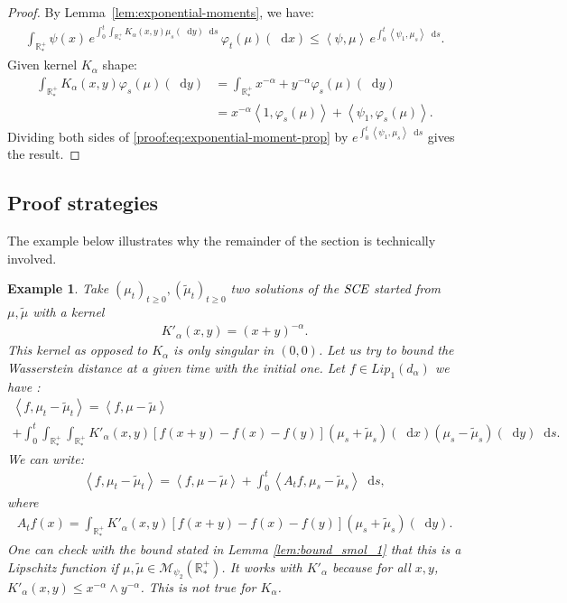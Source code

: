 \documentclass[11pt,a4paper]{article}
\newcommand{\RRP}{\mathbb{R}^+_*}
\newcommand{\MC}{\mathcal{M}}
\newcommand{\SCE}{\emph{SCE}}
\newcommand{\Proc}[1]{\left(#1\right)_{t\geq 0}}
\newcommand{\brac}[1]{\left\langle#1\right\rangle}
\newcommand{\dd}{\mathop{}\!\mathrm{d}}
\newtheorem{example}[theorem]{Example}
\begin{document}
\begin{proof}
    By Lemma~\ref{lem:exponential-moments}, we have:
    \begin{align}\label{proof:eq:exponential-moment-prop}
        \int_{\RRP} \psi(x)\, e^{\int_0^t \int_{\RRP} K_{\alpha}(x,y) \mu_s(\dd y)\dd s}\, \varphi_t(\mu)(\dd x) \leq \brac{\psi,\mu} \, e^{\int_0^t \brac{\psi_1,\mu_s} \dd s}.
    \end{align}
    Given kernel $K_\alpha$ shape:
    \begin{align*}
        \int_{\RRP} K_{\alpha}(x,y) \varphi_s(\mu)(\dd y) 
        &= \int_{\RRP}x^{-\alpha} + y^{-\alpha} \varphi_s(\mu)(\dd y) \\
        &= x^{-\alpha} \brac{1,\varphi_s(\mu)} + \brac{\psi_1,\varphi_s(\mu)}.
    \end{align*}
    Dividing both sides of \eqref{proof:eq:exponential-moment-prop} by $e^{\int_0^t \brac{\psi_1,\mu_s} \dd s}$ gives the result.
\end{proof}

\subsection{Proof strategies}\label{section:wass-outline}
The example below illustrates why the remainder of the section is technically involved.
\begin{example}\label{exp:wasserstein-is-tricky}
    Take $\Proc{\mu_t} , \Proc{\tilde{\mu}_t}$ two solutions of the $\SCE$ started from $\mu,\tilde{\mu}$ with a kernel
    \begin{align*}
        K'_\alpha(x,y) = (x+y)^{-\alpha} .
    \end{align*}
    This kernel as opposed to $K_\alpha$ is only singular in $(0,0)$. Let us try to bound the Wasserstein distance at a given time with the initial one. Let $f \in Lip_1(d_\alpha)$ we have :
    \begin{multline*}
        \brac{f,\mu_t - \tilde{\mu}_t} = \brac{f,\mu - \tilde{\mu}} \\
        + \int_0^t \int_{\RRP}\int_{\RRP} K'_\alpha(x,y) \left[f(x+y) - f(x) -f(y) \right]\left(\mu_s + \tilde{\mu}_s\right)(\dd x) \left( \mu_s - \tilde{\mu}_s\right)(\dd y)\dd s.
    \end{multline*}
    We can write:
    \begin{align*}
        \brac{f,\mu_t - \tilde{\mu}_t} = \brac{f,\mu - \tilde{\mu}} + \int_0^t \brac{A_tf , \mu_s - \tilde{\mu}_s} \dd s,
    \end{align*}
    where
    \begin{align*}
        A_tf(x) = \int_{\RRP} K'_\alpha(x,y) \left[f(x+y) - f(x) -f(y) \right]\left(\mu_s + \tilde{\mu}_s\right)(\dd y).
    \end{align*}
    One can check with the bound stated in Lemma \ref{lem:bound_smol_1} that this is a Lipschitz function if $\mu,\tilde{\mu} \in \MC_{\psi_2}(\RRP)$. It works with $K'_\alpha$ because for all $x,y$, $K'_\alpha(x,y) \leq x^{-\alpha} \wedge y^{-\alpha}$. This is not true for $K_\alpha$.
\end{example}
\end{document}
